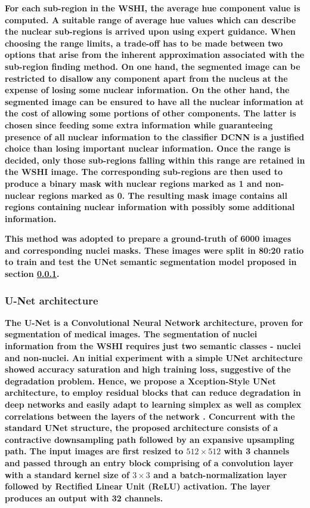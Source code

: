 \documentclass[conference]{IEEEtran}
\begin{document}
\textbf{
For each sub-region in the WSHI, the average hue component value is computed. A suitable range of average hue values which can describe the nuclear sub-regions is arrived upon using expert guidance. When choosing the range limits, a trade-off has to be made between two options that arise from the inherent approximation associated with the sub-region finding method. On one hand, the segmented image can be restricted to disallow any component apart from the nucleus at the expense of losing some nuclear information. On the other hand, the segmented image can be ensured to have all the nuclear information at the cost of allowing some portions of other components. The latter is chosen since feeding some extra information while guaranteeing presence of all nuclear information to the classifier DCNN is a justified choice than losing important nuclear information. Once the range is decided, only those sub-regions falling within this range are retained in the WSHI image. The corresponding sub-regions are then used to produce a binary mask with nuclear regions marked as 1 and non-nuclear regions marked as 0. The resulting mask image contains all regions containing nuclear information with possibly some additional information. 
}

\textbf{
This method was adopted to prepare a ground-truth of 6000 images and corresponding nuclei masks. These images were split in 80:20 ratio to train and test the UNet semantic segmentation model proposed in section \ref{sect_unet_arch}. 
}

\subsubsection{U-Net architecture}
\label{sect_unet_arch}

\textbf{
The U-Net \cite{jonathan} is a Convolutional Neural Network architecture, proven for segmentation of medical images. The segmentation of nuclei information from the WSHI requires just two semantic classes - nuclei and non-nuclei. An initial experiment with a simple UNet architecture showed accuracy saturation and high training loss, suggestive of the degradation problem. Hence, we propose a Xception-Style \cite{chollet} UNet architecture, to employ residual blocks that can reduce degradation in deep networks and easily adapt to learning simplex as well as complex correlations between the layers of the network \cite{veit}. Concurrent with the standard UNet structure, the proposed architecture consists of a contractive downsampling path followed by an expansive upsampling path. The input images are first resized to $512\times512$ with 3 channels and passed through an entry block comprising of a convolution layer with a standard kernel size of $3\times3$ and a batch-normalization layer followed by Rectified Linear Unit (ReLU) activation. The layer produces an output with 32 channels.
}
\end{document}
